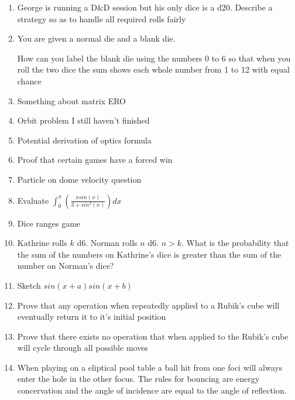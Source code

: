 \documentclass[a4paper]{article}
\begin{document}
\begin{enumerate}
\item
George is running a D\&D session but his only dice is a d20. Describe a strategy so as to handle all required rolls fairly

\item
You are given a normal die and a blank die.

How can you label the blank die using the numbers 0 to 6 so that when you roll the two dice the sum shows each whole number from 1 to 12 with equal chance

\item
Something about matrix ERO

\item
Orbit problem I still haven't finished

\item
Potential derivation of optics formula

\item
Proof that certain games have a forced win

\item
Particle on dome velocity question

\item
Evaluate
$\int_{0}^{\pi}(\frac{xsin(x)}{3 + sin^2(x)})dx$

\item
Dice ranges game

\item
Kathrine rolls $k$ d6. Norman rolls $n$ d6. $n > k$. What is the probability that the sum of the numbers on Kathrine's dice is greater than the sum of the number on Norman's dice?

\item
Sketch $sin(x+a)sin(x+b)$

\item
Prove that any operation when repeatedly applied to a Rubik's cube will eventually return it to it's initial position

\item
Prove that there exists no operation that when applied to the Rubik's cube will cycle through all possible moves

\item
When playing on a eliptical pool table a ball hit from one foci will always enter the hole in the other focus. The rules for bouncing are energy concervation and the angle of incidence are equal to the angle of reflection.


\end{enumerate}
\end{document}
